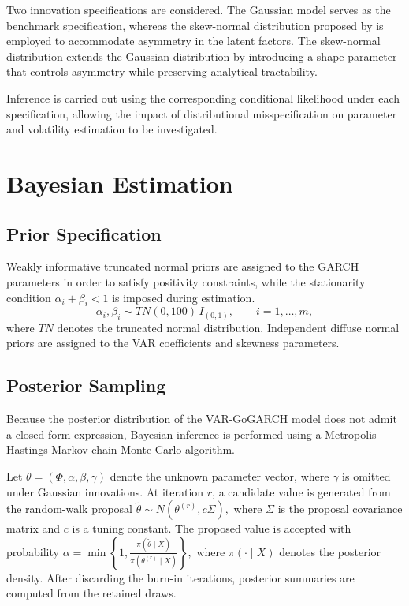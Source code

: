 \documentclass[twoside]{article}
\begin{document}
Two innovation specifications are considered. The Gaussian model serves as the benchmark specification, whereas the skew-normal distribution proposed by \cite{Azzalini1985} is employed to accommodate asymmetry in the latent factors. The skew-normal distribution extends the Gaussian distribution by introducing a shape parameter that controls asymmetry while preserving analytical tractability.

Inference is carried out using the corresponding conditional likelihood under each specification, allowing the impact of distributional misspecification on parameter and volatility estimation to be investigated.

\section{Bayesian Estimation}

\subsection{Prior Specification}

Weakly informative truncated normal priors are assigned to the GARCH parameters in order to satisfy positivity constraints, while the stationarity condition $\alpha_i+\beta_i<1$ is imposed during estimation.
\[
\alpha_i,\beta_i \sim TN(0,100)\,I_{(0,1)},
\qquad i=1,\ldots,m,
\]
where \(TN\) denotes the truncated normal distribution. Independent diffuse normal priors are assigned to the VAR coefficients and skewness parameters.

\subsection{Posterior Sampling}

Because the posterior distribution of the VAR-GoGARCH model does not admit a closed-form expression, Bayesian inference is performed using a Metropolis--Hastings Markov chain Monte Carlo algorithm.

Let $\theta=(\Phi,\alpha,\beta,\gamma)$ denote the unknown parameter vector, where \(\gamma\) is omitted under Gaussian innovations. At iteration \(r\), a candidate value is generated from the random-walk proposal  $\widetilde{\theta}
\sim
N\!\left(
\theta^{(r)},
c\Sigma
\right),
$ where \(\Sigma\) is the proposal covariance matrix and \(c\) is a tuning constant. The proposed value is accepted with probability $
\alpha=
\min
\left\{
1,
\frac{\pi(\widetilde{\theta}\mid X)}
{\pi(\theta^{(r)}\mid X)}
\right\},
$ where \(\pi(\cdot\mid X)\) denotes the posterior density. After discarding the burn-in iterations, posterior summaries are computed from the retained draws.
\end{document}
